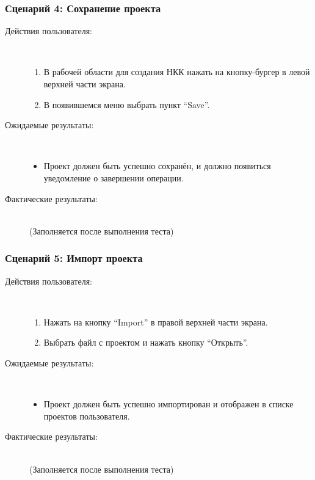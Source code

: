 \documentclass{article}
\begin{document}
    \subsubsection{Сценарий 4: Сохранение проекта}

    \begin{description}
        \item [Действия пользователя:] \\
        \begin{enumerate}
            \item В рабочей области для создания НКК нажать на кнопку-бургер в левой верхней части экрана.
            \item В появившемся меню выбрать пункт ``Save''.
        \end{enumerate}
        \item [Ожидаемые результаты:]\\
        \begin{itemize}
            \item Проект должен быть успешно сохранён, и должно появиться уведомление о завершении операции.
        \end{itemize}
        \item [Фактические результаты:]\\
        (Заполняется после выполнения теста)
    \end{description}

    \subsubsection{Сценарий 5: Импорт проекта}

    \begin{description}
        \item [Действия пользователя:]\\
        \begin{enumerate}
            \item Нажать на кнопку ``Import'' в правой верхней части экрана.
            \item Выбрать файл с проектом и нажать кнопку ``Открыть''.
        \end{enumerate}
        \item [Ожидаемые результаты:]\\
        \begin{itemize}
            \item Проект должен быть успешно импортирован и отображен в списке проектов пользователя.
        \end{itemize}
        \item [Фактические результаты:]\\
        (Заполняется после выполнения теста)
    \end{description}
\end{document}
